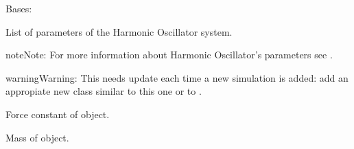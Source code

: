 \documentclass[a4paper,landscape,10pt,english]{sphinxmanual}
\begin{document}

\begin{fulllineitems}
\label{\detokenize{code_docs/simulation_API.controller:simulation_API.controller.schemas.HOParams}}
Bases: 

List of parameters of the Harmonic Oscillator system.

\begin{sphinxadmonition}{note}{Note:}
For more information about Harmonic Oscillator’s parameters see
{\hyperref[\detokenize{code_docs/simulation_API.simulation:simulation_API.simulation.simulations.HarmonicOsc1D}]{}}.
\end{sphinxadmonition}

\begin{sphinxadmonition}{warning}{Warning:}
This needs update each time a new simulation is added: add an
appropiate new class similar to this one or to
{\hyperref[\detokenize{code_docs/simulation_API.controller:simulation_API.controller.schemas.ChenLeeParams}]{}}.
\end{sphinxadmonition}

\begin{fulllineitems}
\label{\detokenize{code_docs/simulation_API.controller:simulation_API.controller.schemas.HOParams.k}}
Force constant of object.

\end{fulllineitems}


\begin{fulllineitems}
\label{\detokenize{code_docs/simulation_API.controller:simulation_API.controller.schemas.HOParams.m}}
Mass of object.

\end{fulllineitems}


\end{fulllineitems}
\end{document}
